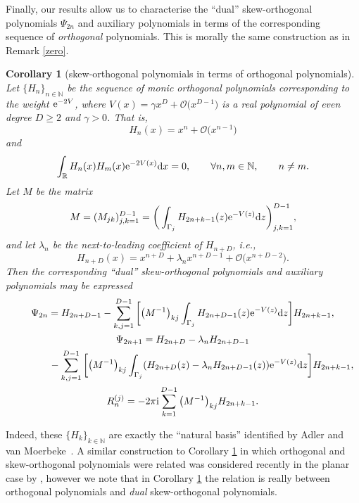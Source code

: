 \documentclass[pdftex]{sigma}
\numberwithin{equation}{section}
\newtheorem{Corollary}[Theorem]{Corollary}
\begin{document}
Finally, our results allow us to characterise the \enquote{dual} skew-orthogonal polynomials $\Psi_{2n}$ and auxiliary polynomials  in terms of the corresponding sequence of \textit{orthogonal} polynomials. This is morally the same construction as in Remark \ref{zero}.

\begin{Corollary}[skew-orthogonal polynomials in terms of orthogonal polynomials]\label{orthog} Let $\{\! H_{\!n}\! \}_{\!n \in \mathbb{N}}$ be the sequence of monic orthogonal polynomials corresponding to the weight ${\rm e}^{-2V}$, where $V(x) = \gamma x^D+ \mathcal{O}\big(x^{D-1}\big)$ is a real polynomial of even degree $D \geq 2$ and $\gamma > 0$. That is,
\[H_n(x) = x^n + \mathcal{O}\big(x^{n-1}\big)\]
and
\begin{align*}
\int_\mathbb{R}H_n(x) H_m(x) {\rm e}^{-2V(x)} {\rm d}x = 0,\qquad \forall n,m \in \mathbb{N},\qquad n \neq m.
\end{align*}
Let $M$ be the matrix
\begin{equation*}
M = ( M_{jk})_{j,k=1}^{D-1} = \bigg( \int_{\Gamma_j} H_{2n+k-1}(z) {\rm e}^{-V(z)} {\rm d}z \bigg)_{j,k=1}^{D-1},
\end{equation*}
and let $\lambda_n$ be the next-to-leading coefficient of $H_{n+D}$, i.e.,
\begin{equation*}
H_{n+D}(x) = x^{n+D}+\lambda_n x^{n+D-1} + \mathcal{O}\big(x^{n+D-2}\big).
\end{equation*}
Then the corresponding \enquote{dual} skew-orthogonal polynomials and auxiliary polynomials may be expressed
\begin{gather*}
\Psi_{2n} = H_{2n+D-1} - \sum_{k,j=1}^{D-1} \bigg[ \big(M^{-1}\big)_{kj}\int_{\Gamma_j} H_{2n+D-1}(z){\rm e}^{-V(z)} {\rm d}z \bigg] H_{2n+k-1}, \\
\Psi_{2n+1} = H_{2n+D} - \lambda_n H_{2n+D-1} \\
\phantom{\Psi_{2n+1} =}{}- \sum_{k,j=1}^{D-1} \bigg[ \big(M^{-1}\big)_{kj}\int_{\Gamma_j} (H_{2n+D}(z) - \lambda_n H_{2n+D-1}(z)){\rm e}^{-V(z)} {\rm d}z \bigg] H_{2n+k-1} ,\\
R^{(j)}_n = - 2\pi {\rm i} \sum_{k=1}^{D-1} \big(M^{-1}\big)_{kj} H_{2n+k-1}.
\end{gather*}
\end{Corollary}
Indeed, these $\{ H_k \}_{k \in \mathbb{N}}$ are exactly the \enquote{natural basis} identified by Adler and van Moerbeke~\cite{adler1999pfaff}. A similar construction to Corollary \ref{orthog} in which orthogonal and skew-orthogonal polynomials were related was considered recently in the planar case by \cite{Akemann:2022aa}, however we note that in Corollary \ref{orthog} the relation is really between orthogonal polynomials and \textit{dual} skew-orthogonal polynomials.
\end{document}

